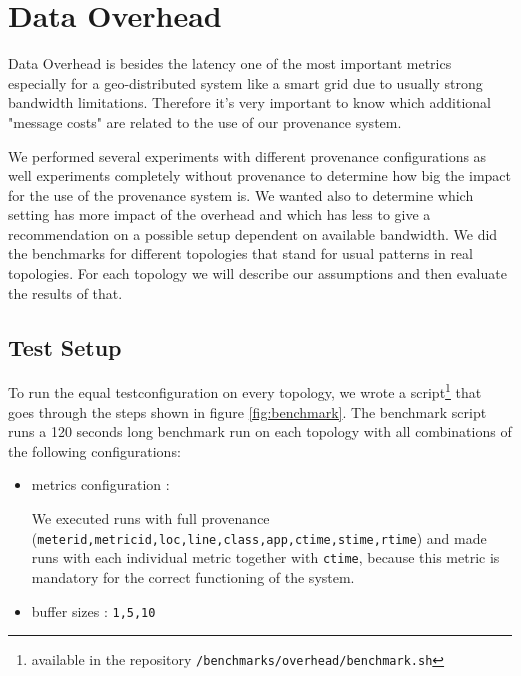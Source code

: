 \section{Data Overhead}
Data Overhead is besides the latency one of the most important metrics especially for a geo-distributed system like a smart grid due to usually strong bandwidth limitations. Therefore it's very important to know which additional "message costs" are related to the use of our provenance system.

We performed several experiments with different provenance configurations as well experiments completely without provenance to determine how big the impact for the use of the provenance system is. We wanted also to determine which setting has more impact of the overhead and which has less to give a recommendation on a possible setup dependent on available bandwidth.
We did the benchmarks for different topologies that stand for usual patterns in real topologies. For each topology we will describe our assumptions and then evaluate the results of that.

\subsection{Test Setup}
To run the equal testconfiguration on every topology, we wrote a script\footnote{available in the repository \texttt{/benchmarks/overhead/benchmark.sh}} that goes through the steps shown in figure \ref{fig:benchmark}.
The benchmark script runs a 120 seconds long benchmark run on each topology with all combinations of the following configurations:


\begin{itemize}
\item metrics configuration :

We executed runs with full provenance (\texttt{meterid,metricid,loc,line,class,app,ctime,stime,rtime}) and made runs with each individual metric together with \texttt{ctime}, because this metric is mandatory for the correct functioning of the system.

\item buffer sizes : \texttt{1,5,10}
\end{itemize}



